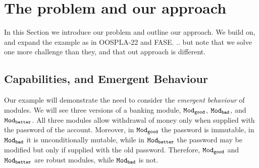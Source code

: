 

\section{The problem and our approach}
\label{s:outline}
 
In this Section we introduce our problem and outline our approach. 
 We build on, and expand the  example as in OOSPLA-22 and FASE. .. but note that we solve one more challenge than they, and that out approach is different.
 

 \subsection{Capabilities, and Emergent Behaviour} %
\label{s:bank}
Our example will demonstrate the need to consider the \emph{emergent behaviour} of modules. 
We will see three versions of a banking module, ${\texttt{Mod}}_{{\texttt{good}}}$, ${\texttt{Mod}}_{{\texttt{bad}}}$, and ${\texttt{Mod}}_{{\texttt{better}}}$.
All three modules allow withdrawal of  money only when supplied with the password of the account.
Moreover, in ${\texttt{Mod}}_{{\texttt{good}}}$ the password is immutable, in ${\texttt{Mod}}_{{\texttt{bad}}}$ it is unconditionally mutable, while in ${\texttt{Mod}}_{{\texttt{better}}}$ the password may be modified but only if supplied with the old password. 
Therefore, ${\texttt{Mod}}_{{\texttt{good}}}$ and ${\texttt{Mod}}_{{\texttt{better}}}$ are robust modules, while  ${\texttt{Mod}}_{{\texttt{bad}}}$ is not.

\noindent
{}




